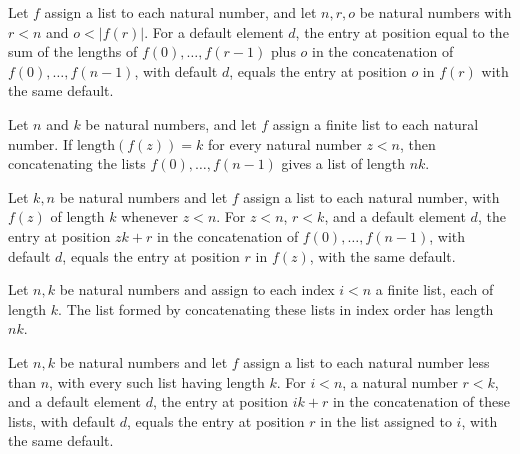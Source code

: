 \begin{theorem}
\label{List.getD_flatMap_range_sum}
\leanok
{}
Let $f$ assign a list to each natural number, and let $n,r,o$ be natural numbers with
$r<n$ and $o<|f(r)|$. For a default element $d$, the entry at position equal to the sum
of the lengths of $f(0),\ldots,f(r-1)$ plus $o$ in the concatenation of
$f(0),\ldots,f(n-1)$, with default $d$, equals the entry at position $o$ in $f(r)$ with
the same default.
\end{theorem}

\begin{theorem}
\label{List.length_flatMap_range}
\leanok
{}
Let $n$ and $k$ be natural numbers, and let $f$ assign a finite list to each natural
number. If $\text{length}(f(z))=k$ for every natural number $z<n$, then concatenating
the lists $f(0),\ldots,f(n-1)$ gives a list of length $nk$.
\end{theorem}

\begin{theorem}
\label{List.getD_flatMap_range}
\leanok
{}
Let $k,n$ be natural numbers and let $f$ assign a list to each natural number, with
$f(z)$ of length $k$ whenever $z<n$. For $z<n$, $r<k$, and a default element $d$, the
entry at position $zk+r$ in the concatenation of $f(0),\ldots,f(n-1)$, with default $d$,
equals the entry at position $r$ in $f(z)$, with the same default.
\end{theorem}

\begin{theorem}
\label{List.length_flatMap_finRange}
\leanok
{}
Let $n,k$ be natural numbers and assign to each index $i<n$ a finite list, each of
length $k$. The list formed by concatenating these lists in index order has length $n
k$.
\end{theorem}

\begin{theorem}
\label{List.getD_flatMap_finRange}
\leanok
{}
Let $n,k$ be natural numbers and let $f$ assign a list to each natural number less than
$n$, with every such list having length $k$. For $i<n$, a natural number $r<k$, and a
default element $d$, the entry at position $ik+r$ in the concatenation of these lists,
with default $d$, equals the entry at position $r$ in the list assigned to $i$, with the
same default.
\end{theorem}

